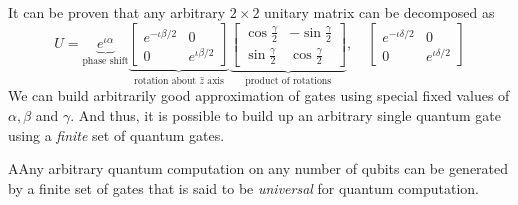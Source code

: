 It can be proven that any arbitrary $2\times2$ unitary matrix can be decomposed as 
\begin{equation}
    U = \underbrace{e^{\iota\alpha}}_{\text{phase shift}}
    \underbrace{
    \begin{bmatrix}
    e^{-\iota\beta / 2} & 0 \\
    0 & e^{\iota\beta / 2}
    \end{bmatrix}}_{\text{rotation about } \hat z\text{ axis}} 
    \underbrace{
    \begin{bmatrix}
    \cos \frac{\gamma}{2} & -\sin\frac{\gamma}{2} \\
    \sin\frac{\gamma}{2} & \cos\frac{\gamma}{2}
    \end{bmatrix}}_{\text{product of rotations}},\quad
    \begin{bmatrix}
    e^{-\iota\delta / 2} & 0 \\
    0 & e^{\iota\delta / 2}
    \end{bmatrix}
\end{equation}
We can build arbitrarily good approximation of gates using special fixed values of $\alpha, \beta$ and $\gamma$. And thus, it is possible to build up an arbitrary single quantum gate using a \textit{finite} set of quantum gates.
\begin{proposition}
AAny arbitrary quantum computation on any number of qubits can be generated by a finite set of gates that is said to be \textit{universal} for quantum computation.
\end{proposition}
